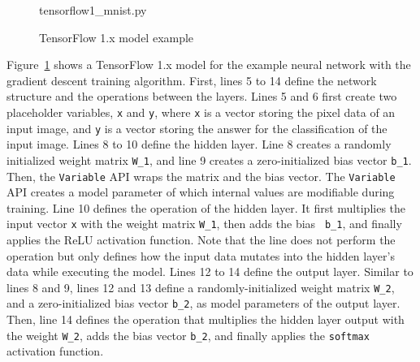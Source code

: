 \begin{figure}[ht!]\centering

{tensorflow1_mnist.py}
  \caption{TensorFlow 1.x model example}
\label{fig:back:tf1}
\end{figure}

Figure~\ref{fig:back:tf1} shows a TensorFlow 1.x model for the example neural
network with the gradient descent training algorithm.
First, lines 5 to 14 define the network structure and the operations
between the layers.
Lines 5 and 6 first create two placeholder variables, {\tt x} and {\tt y},
where {\tt x} is a vector storing the pixel data of an input image, and {\tt y}
is a vector storing the answer for the classification of the input image. 
Lines 8 to 10 define the hidden layer.
Line 8 creates a randomly initialized weight matrix {\tt W\_1}, and line 9
creates a zero-initialized bias vector {\tt b\_1}.
Then, the {\tt Variable} API wraps the matrix and the bias vector.
The {\tt Variable} API creates a model parameter of which internal values are
modifiable during training.
Line 10 defines the operation of the hidden layer. It first multiplies the
input vector {\tt x} with the weight matrix {\tt W\_1}, then adds the bias {\tt
b\_1}, and finally applies the ReLU activation function. 
Note that the line does not perform the operation but only defines how
the input data mutates into the hidden layer's data while executing the
model.
Lines 12 to 14 define the output layer.
Similar to lines 8 and 9, lines 12 and 13 define a randomly-initialized
weight matrix {\tt W\_2}, and a zero-initialized bias vector {\tt b\_2}, as
model parameters of the output layer.
Then, line 14 defines the operation that
multiplies the hidden layer output with
the weight {\tt W\_2}, adds the bias vector {\tt b\_2}, and finally applies the
{\tt softmax} activation function.





